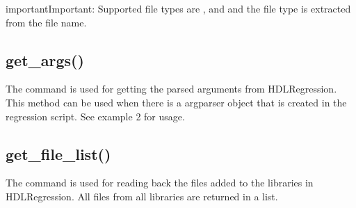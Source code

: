 \documentclass[letterpaper,10pt,english]{sphinxmanual}
\begin{document}
\sphinxAtStartPar
{}

\begin{sphinxVerbatim}[commandchars=\\\{\}]
 
  
\end{sphinxVerbatim}

\begin{sphinxadmonition}{important}{Important:}
\sphinxAtStartPar
Supported file types are ,  and  and the file type is extracted from the file name.
\end{sphinxadmonition}


\subsection{get\_args()}
\label{\detokenize{api:get-args}}
\sphinxAtStartPar
The command is used for getting the parsed arguments from HDLRegression.
This method can be used when there is a argparser object that is created in the regression script.
See {\hyperref[\detokenize{api:hdlregression}]{}} example 2 for usage.

\sphinxAtStartPar
{}

\begin{sphinxVerbatim}[commandchars=\\\{\}]
  
\end{sphinxVerbatim}


\subsection{get\_file\_list()}
\label{\detokenize{api:get-file-list}}
\sphinxAtStartPar
The command is used for reading back the files added to the libraries in HDLRegression.
All files from all libraries are returned in a list.
\end{document}
